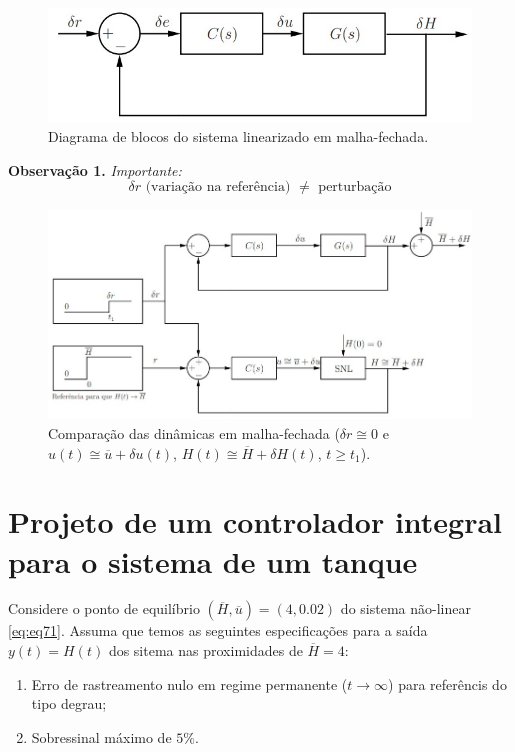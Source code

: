 \documentclass[
]{book}
\providecommand{\tightlist}{%
  \setlength{\itemsep}{0pt}\setlength{\parskip}{0pt}}
\theoremstyle{definition}
\theoremstyle{definition}
\theoremstyle{definition}
\theoremstyle{remark}
\begin{document}
\begin{figure}

{\centering \includegraphics[width=0.5\linewidth]{Imagens/Lab7/Apresentação/fig1} 

}

\caption{Diagrama de blocos do sistema linearizado em malha-fechada.}\label{fig:fig71}
\end{figure}

\textbf{Observação 1.} \emph{Importante:}
\[
\boxed{\delta r \text{ (variação na referência) } \neq \text{ perturbação}}
\]

\begin{figure}

{\centering \includegraphics[width=0.7\linewidth]{Imagens/Lab7/Apresentação/fig2} 

}

\caption{Comparação das dinâmicas em malha-fechada ($\delta r \cong 0$ e $u(t) \cong \overline{u} + \delta u(t)$, $H(t) \cong \overline{H} + \delta H(t)$, $t \geq t_1$).}\label{fig:fig72}
\end{figure}

\hypertarget{projeto-de-um-controlador-integral-para-o-sistema-de-um-tanque}{%
\section{Projeto de um controlador integral para o sistema de um tanque}\label{projeto-de-um-controlador-integral-para-o-sistema-de-um-tanque}}

Considere o ponto de equilíbrio \((\overline{H}, \overline{u}) = (4, 0.02)\) do sistema não-linear \eqref{eq:eq71}. Assuma que temos as seguintes especificações para a saída \(y(t) = H(t)\) dos sitema nas proximidades de \(\overline{H} =4\):

\begin{enumerate}
\def\labelenumi{\arabic{enumi}.}
\tightlist
\item
  Erro de rastreamento nulo em regime permanente (\(t\to\infty\)) para referêncis do tipo degrau;
\item
  Sobressinal máximo de \(5\%\).
\end{enumerate}
\end{document}
